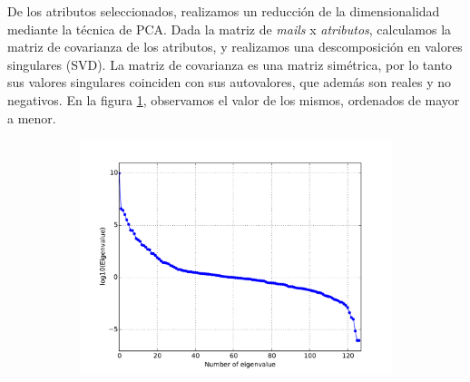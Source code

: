 \documentclass[a4paper,10pt]{article}
\begin{document}
\par De los atributos seleccionados, realizamos un reducción de la dimensionalidad
mediante la técnica de PCA. Dada la matriz de \emph{mails} x \emph{atributos},
calculamos la matriz de covarianza de los atributos, y realizamos una descomposición en valores singulares (SVD). La matriz de covarianza es una matriz simétrica, por lo tanto sus valores singulares coinciden con sus autovalores, que además son reales y no negativos. En la figura \ref{fig:autovalores}, observamos el valor de los mismos, ordenados de mayor a menor. 
  \begin{figure}[H]
    \centering
    \begin{subfigure}[b]{0.4\textwidth}
      \includegraphics[width=\textwidth]{../imagenes/Autovalores}
      \caption{}
    \end{subfigure}
    \label{fig:autovalores}
  \end{figure}
\end{document}
